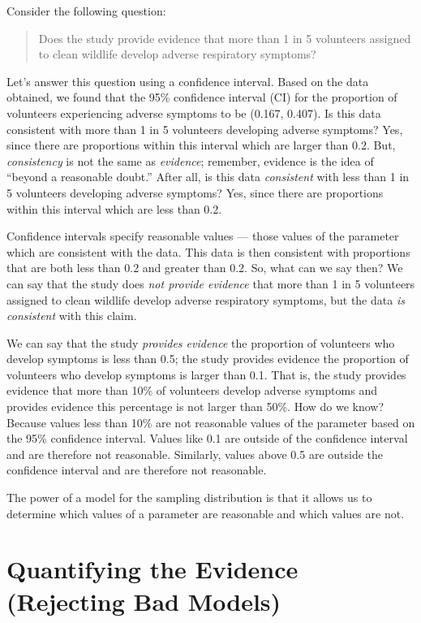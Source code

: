 \documentclass[
  letterpaper,
  DIV=11,
  numbers=noendperiod]{scrreprt}
\theoremstyle{plain}
\theoremstyle{definition}
\theoremstyle{definition}
\theoremstyle{remark}
\begin{document}
Consider the following question:

\begin{quote}
Does the study provide evidence that more than 1 in 5 volunteers
assigned to clean wildlife develop adverse respiratory symptoms?
\end{quote}

Let's answer this question using a confidence interval. Based on the
data obtained, we found that the 95\% confidence interval (CI) for the
proportion of volunteers experiencing adverse symptoms to be (0.167,
0.407). Is this data consistent with more than 1 in 5 volunteers
developing adverse symptoms? Yes, since there are proportions within
this interval which are larger than 0.2. But, \emph{consistency} is not
the same as \emph{evidence}; remember, evidence is the idea of ``beyond
a reasonable doubt.'' After all, is this data \emph{consistent} with
less than 1 in 5 volunteers developing adverse symptoms? Yes, since
there are proportions within this interval which are less than 0.2.

Confidence intervals specify reasonable values --- those values of the
parameter which are consistent with the data. This data is then
consistent with proportions that are both less than 0.2 and greater than
0.2. So, what can we say then? We can say that the study does \emph{not
provide evidence} that more than 1 in 5 volunteers assigned to clean
wildlife develop adverse respiratory symptoms, but the data \emph{is
consistent} with this claim.

We can say that the study \emph{provides evidence} the proportion of
volunteers who develop symptoms is less than 0.5; the study provides
evidence the proportion of volunteers who develop symptoms is larger
than 0.1. That is, the study provides evidence that more than 10\% of
volunteers develop adverse symptoms and provides evidence this
percentage is not larger than 50\%. How do we know? Because values less
than 10\% are not reasonable values of the parameter based on the 95\%
confidence interval. Values like 0.1 are outside of the confidence
interval and are therefore not reasonable. Similarly, values above 0.5
are outside the confidence interval and are therefore not reasonable.

The power of a model for the sampling distribution is that it allows us
to determine which values of a parameter are reasonable and which values
are not.

\chapter{Quantifying the Evidence (Rejecting Bad
Models)}\label{sec-nulldistns}
\end{document}
